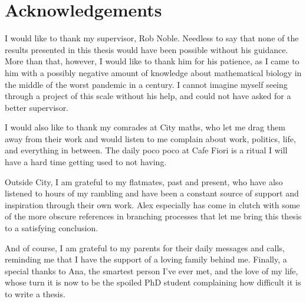 \chapter*{Acknowledgements}

I would like to thank my supervisor, Rob Noble. Needless to say that none of
the results presented in this thesis would have been possible without his
guidance. More than that, however, I would like to thank him for his patience,
as I came to him with a possibly negative amount of knowledge about
mathematical biology in the middle of the worst pandemic in a century. I cannot
imagine myself seeing through a project of this scale without his help, and
could not have asked for a better supervisor.\par
I would also like to thank my comrades at City maths, who let me drag them away
from their work and would listen to me complain about work, politics, life, and
everything in between. The daily poco poco at Cafe Fiori is a ritual I will
have a hard time getting used to not having. \par
Outside City, I am grateful to my flatmates, past and present, who have also
listened to hours of my rambling and have been a constant source of support and
inspiration through their own work. Alex especially has come in clutch with some
of the more obscure references in branching processes that let me bring this
thesis to a satisfying conclusion. \par
And of course, I am grateful to my parents for their daily messages and calls,
reminding me that I have the support of a loving family behind me. Finally, a
special thanks to Ana, the smartest person I've ever met, and the love of my
life, whose turn it is now to be the spoiled PhD student complaining how
difficult it is to write a thesis. \par
